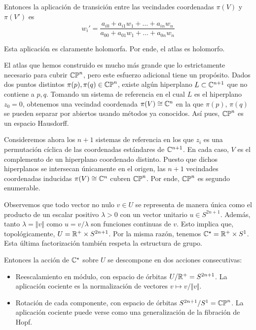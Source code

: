 \begin{solution}
\begin{enumerate}[label=\alph*)]
    Entonces la aplicación de transición entre las vecindades coordenadas $\pi(V)$ y $\pi(V')$ es
    $$
    w_i' = \frac
        {a_{i0} + a_{i1} w_1 + \dots + a_{in} w_n}
        {a_{00} + a_{01} w_1 + \dots + a_{0n} w_n}
    $$
    
    Esta aplicación es claramente holomorfa. Por ende, el atlas es holomorfo.
    
    El atlas que hemos construido es mucho más grande que lo estrictamente necesario para cubrir $\mathbb {CP}^n$, pero este esfuerzo adicional tiene un propósito. Dados dos puntos distintos $\pi(p), \pi(q) \in \mathbb {CP}^n$, existe algún hiperplano $L \subset \mathbb C^{n+1}$ que no contiene a $p, q$. Tomando un sistema de referencia en el cual $L$ es el hiperplano $z_0 = 0$, obtenemos una vecindad coordenada $\pi(V) \cong \mathbb C^n$ en la que $\pi(p)$, $\pi(q)$ se pueden separar por abiertos usando métodos ya conocidos. Así pues, $\mathbb {CP}^n$ es un espacio Hausdorff.
    
    Consideremos ahora los $n+1$ sistemas de referencia en los que $z_i$ es una permutación cíclica de las coordenadas estándares de $\mathbb C^{n+1}$. En cada caso, $V$ es el complemento de un hiperplano coordenado distinto. Puesto que dichos hiperplanos se intersecan únicamente en el origen, las $n+1$ vecindades coordenadas inducidas $\pi(V) \cong \mathbb C^n$ cubren $\mathbb {CP}^n$. Por ende, $\mathbb {CP}^n$ es segundo enumerable.
    
    Observemos que todo vector no nulo $v \in U$ se representa de manera única como el producto de un escalar positivo $\lambda > 0$ con un vector unitario $u \in S^{2n+1}$. Además, tanto $\lambda = \Vert v \Vert$ como $u = v / \lambda$ son funciones continuas de $v$. Esto implica que, topológicamente, $U = \mathbb R^+ \times S^{2n+1}$. Por la misma razón, tenemos $\mathbb C^\star = \mathbb R^+ \times S^1$. Esta última factorización también respeta la estructura de grupo.
    
    Entonces la acción de $\mathbb C^\star$ sobre $U$ se descompone en dos acciones consecutivas:
    \begin{itemize}
        \item Reescalamiento en módulo, con espacio de órbitas $U / \mathbb R^+ = S^{2n+1}$. La aplicación cociente es la normalización de vectores $v \mapsto v / \Vert v \Vert$.
        
        \item Rotación de cada componente, con espacio de órbitas $S^{2n+1} / S^1 = \mathbb {CP}^n$. La aplicación cociente puede verse como una generalización de la fibración de Hopf.
    \end{itemize}
    

\end{enumerate}
\end{solution}
